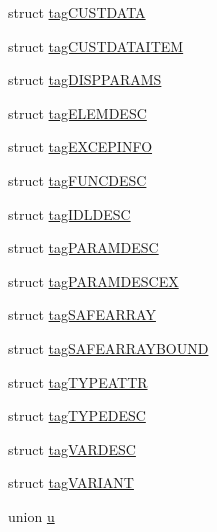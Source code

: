 \begin{DoxyCompactItemize}
struct \hyperlink{struct_i_ole_automation_types_1_1tag_c_u_s_t_d_a_t_a}{tag\+C\+U\+S\+T\+D\+A\+TA}
\item 
struct \hyperlink{struct_i_ole_automation_types_1_1tag_c_u_s_t_d_a_t_a_i_t_e_m}{tag\+C\+U\+S\+T\+D\+A\+T\+A\+I\+T\+EM}
\item 
struct \hyperlink{struct_i_ole_automation_types_1_1tag_d_i_s_p_p_a_r_a_m_s}{tag\+D\+I\+S\+P\+P\+A\+R\+A\+MS}
\item 
struct \hyperlink{struct_i_ole_automation_types_1_1tag_e_l_e_m_d_e_s_c}{tag\+E\+L\+E\+M\+D\+E\+SC}
\item 
struct \hyperlink{struct_i_ole_automation_types_1_1tag_e_x_c_e_p_i_n_f_o}{tag\+E\+X\+C\+E\+P\+I\+N\+FO}
\item 
struct \hyperlink{struct_i_ole_automation_types_1_1tag_f_u_n_c_d_e_s_c}{tag\+F\+U\+N\+C\+D\+E\+SC}
\item 
struct \hyperlink{struct_i_ole_automation_types_1_1tag_i_d_l_d_e_s_c}{tag\+I\+D\+L\+D\+E\+SC}
\item 
struct \hyperlink{struct_i_ole_automation_types_1_1tag_p_a_r_a_m_d_e_s_c}{tag\+P\+A\+R\+A\+M\+D\+E\+SC}
\item 
struct \hyperlink{struct_i_ole_automation_types_1_1tag_p_a_r_a_m_d_e_s_c_e_x}{tag\+P\+A\+R\+A\+M\+D\+E\+S\+C\+EX}
\item 
struct \hyperlink{struct_i_ole_automation_types_1_1tag_s_a_f_e_a_r_r_a_y}{tag\+S\+A\+F\+E\+A\+R\+R\+AY}
\item 
struct \hyperlink{struct_i_ole_automation_types_1_1tag_s_a_f_e_a_r_r_a_y_b_o_u_n_d}{tag\+S\+A\+F\+E\+A\+R\+R\+A\+Y\+B\+O\+U\+ND}
\item 
struct \hyperlink{struct_i_ole_automation_types_1_1tag_t_y_p_e_a_t_t_r}{tag\+T\+Y\+P\+E\+A\+T\+TR}
\item 
struct \hyperlink{struct_i_ole_automation_types_1_1tag_t_y_p_e_d_e_s_c}{tag\+T\+Y\+P\+E\+D\+E\+SC}
\item 
struct \hyperlink{struct_i_ole_automation_types_1_1tag_v_a_r_d_e_s_c}{tag\+V\+A\+R\+D\+E\+SC}
\item 
struct \hyperlink{struct_i_ole_automation_types_1_1tag_v_a_r_i_a_n_t}{tag\+V\+A\+R\+I\+A\+NT}
\item 
union \hyperlink{union_i_ole_automation_types_1_1u}{u}
\end{DoxyCompactItemize}

